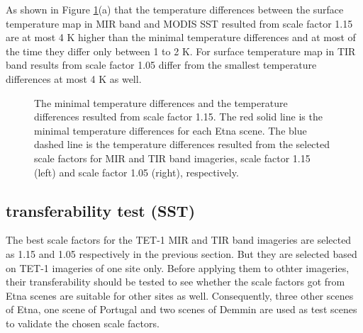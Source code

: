 \noindent As shown in Figure \ref{fig:etna_bsc&temComp}(a) that the temperature differences between the surface temperature map in MIR band and MODIS SST resulted from scale factor 1.15 are at most 4 K higher than the minimal temperature differences and at most of the time they differ only between 1 to 2 K. For surface temperature map in TIR band results from scale factor 1.05 differ from the smallest temperature differences at most 4 K as well.\\

\begin{figure}[!htbp]
\centering
{}
\hspace{0.5in}
\caption{The minimal temperature differences and the temperature differences resulted from scale factor 1.15. The red solid line is the minimal temperature differences for each Etna scene. The blue dashed line is the temperature differences resulted from the selected scale factors for MIR and TIR band imageries, scale factor 1.15 (left) and scale factor 1.05 (right), respectively.}
\label{fig:etna_bsc&temComp}
\end{figure}




\subsection{transferability test (SST)}
The best scale factors for the TET-1 MIR and TIR band imageries are selected as 1.15 and 1.05 respectively in the previous section. But they are selected based on TET-1 imageries of one site only. Before applying them to othter imageries, their transferability should be tested to see whether the scale factors got from Etna scenes are suitable for other sites as well. Consequently, three other scenes of Etna, one scene of Portugal and two scenes of Demmin are used as test scenes to validate the chosen scale factors.\\

